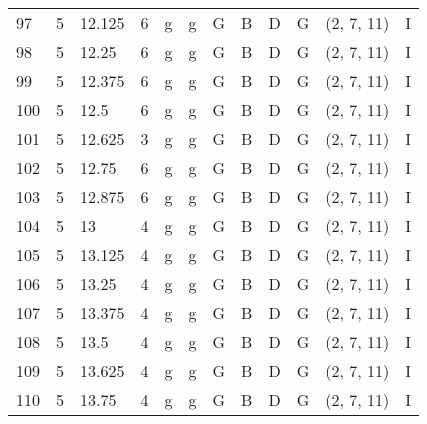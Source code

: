 \begin{tabular}{llllllllllll}
97  & 5       & 12.125 & 6               & g          & g              & G      & B       & D      & G         & (2, 7, 11)       & I              \\
98  & 5       & 12.25  & 6               & g          & g              & G      & B       & D      & G         & (2, 7, 11)       & I              \\
99  & 5       & 12.375 & 6               & g          & g              & G      & B       & D      & G         & (2, 7, 11)       & I              \\
100 & 5       & 12.5   & 6               & g          & g              & G      & B       & D      & G         & (2, 7, 11)       & I              \\
101 & 5       & 12.625 & 3               & g          & g              & G      & B       & D      & G         & (2, 7, 11)       & I              \\
102 & 5       & 12.75  & 6               & g          & g              & G      & B       & D      & G         & (2, 7, 11)       & I              \\
103 & 5       & 12.875 & 6               & g          & g              & G      & B       & D      & G         & (2, 7, 11)       & I              \\
104 & 5       & 13     & 4               & g          & g              & G      & B       & D      & G         & (2, 7, 11)       & I              \\
105 & 5       & 13.125 & 4               & g          & g              & G      & B       & D      & G         & (2, 7, 11)       & I              \\
106 & 5       & 13.25  & 4               & g          & g              & G      & B       & D      & G         & (2, 7, 11)       & I              \\
107 & 5       & 13.375 & 4               & g          & g              & G      & B       & D      & G         & (2, 7, 11)       & I              \\
108 & 5       & 13.5   & 4               & g          & g              & G      & B       & D      & G         & (2, 7, 11)       & I              \\
109 & 5       & 13.625 & 4               & g          & g              & G      & B       & D      & G         & (2, 7, 11)       & I              \\
110 & 5       & 13.75  & 4               & g          & g              & G      & B       & D      & G         & (2, 7, 11)       & I              \\

\end{tabular}
